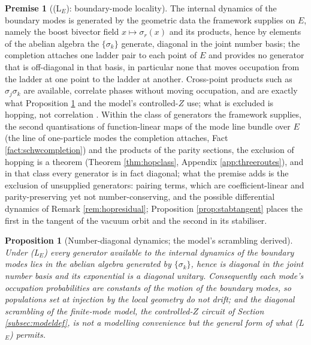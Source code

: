 \documentclass[11pt]{article}
\newtheorem{proposition}[theorem]{Proposition}
\theoremstyle{definition}
\newtheorem{premise}[theorem]{Premise}
\begin{document}
\begin{premise}[(L$_E$): boundary-mode locality]\label{prem:local}
The internal dynamics of the boundary modes is generated by the geometric data the framework supplies on $E$, namely the boost bivector field $x \mapsto \sigma_r(x)$ and its products, hence by elements of the abelian algebra the $\{\sigma_k\}$ generate, diagonal in the joint number basis; the completion attaches one ladder pair to each point of $E$ and provides no generator that is off-diagonal in that basis, in particular none that moves occupation from the ladder at one point to the ladder at another. Cross-point products such as $\sigma_j\sigma_k$ are available, correlate phases without moving occupation, and are exactly what Proposition \ref{prop:diagonal} and the model's controlled-$Z$ use; what is excluded is hopping, not correlation \cite[Cor.~4.5, Thm.~8.12]{ButlerT4}. Within the class of generators the framework supplies, the second quantisations of function-linear maps of the mode line bundle over $E$ (the line of one-particle modes the completion attaches, Fact \ref{fact:schwcompletion}) and the products of the parity sections, the exclusion of hopping is a theorem (Theorem \ref{thm:hopclass}, Appendix \ref{app:threeroutes}), and in that class every generator is in fact diagonal; what the premise adds is the exclusion of unsupplied generators: pairing terms, which are coefficient-linear and parity-preserving yet not number-conserving, and the possible differential dynamics of Remark \ref{rem:hopresidual}; Proposition \ref{prop:stabtangent} places the first in the tangent of the vacuum orbit and the second in its stabiliser.
\end{premise}

\begin{proposition}[Number-diagonal dynamics; the model's scrambling derived]\label{prop:diagonal}
Under (L$_E$) every generator available to the internal dynamics of the boundary modes lies in the abelian algebra generated by $\{\sigma_k\}$, hence is diagonal in the joint number basis and its exponential is a diagonal unitary. Consequently each mode's occupation probabilities are constants of the motion of the boundary modes, so populations set at injection by the local geometry do not drift; and the diagonal scrambling of the finite-mode model, the controlled-$Z$ circuit of Section \ref{subsec:modeldef}, is not a modelling convenience but the general form of what (L$_E$) permits.
\end{proposition}
\end{document}
